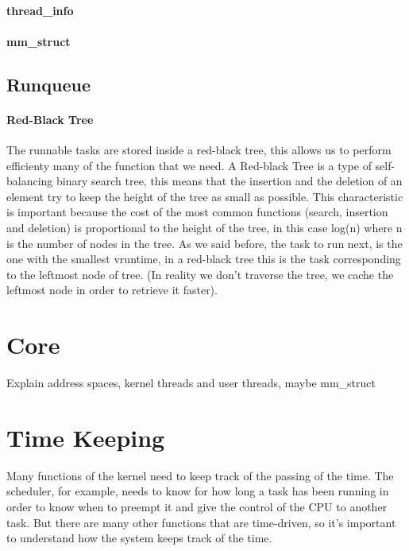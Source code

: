 \paragraph{thread\_info}
\paragraph{mm\_struct}

\subsection{Runqueue}

\paragraph{Red-Black Tree}
The runnable tasks are stored inside a red-black tree, this allows us to perform efficienty many of the function that we need.
A Red-black Tree is a type of self-balancing binary search tree, this means that the insertion and the deletion of an element try to keep the height of the tree as small as possible. This characteristic is important because the cost of the most common functions (search, insertion and deletion) is proportional to the height of the tree, in this case log(n) where n is the number of nodes in the tree.
As we said before, the task to run next, is the one with the smallest vruntime, in a red-black tree this is the task corresponding to the leftmost node of tree. (In reality we don't traverse the tree, we cache the leftmost node in order to retrieve it faster).

\section{Core} 
\label{sec:core}
Explain address spaces, kernel threads and user threads, maybe mm\_struct

\section{Time Keeping}%
\label{sec:timekeeping}
Many functions of the kernel need to keep track of the passing of the time. The scheduler, for example, needs to know for how long a task has been running in order to know when to preempt it and give the control of the CPU to another task. But there are many other functions that are time-driven, so it's important to understand how the system keeps track of the time.

